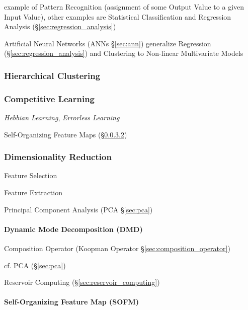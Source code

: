 example of Pattern Recognition (assignment of some Output Value to a given Input
Value), other examples are Statistical Classification and Regression Analysis
(\S\ref{sec:regression_analysis})

Artificial Neural Networks (ANNs \S\ref{sec:ann}) generalize Regression
(\S\ref{sec:regression_analysis}) and Clustering to Non-linear Multivariate
Models



\subsubsection{Hierarchical Clustering}\label{sec:hierarchical_clustering}

\subsubsection{Competitive Learning}\label{sec:competitive_learning}

\emph{Hebbian Learning}, \emph{Errorless Learning}

Self-Organizing Feature Maps (\S\ref{sec:sofm})



\subsubsection{Dimensionality Reduction}\label{sec:dimensionality_reduction}

Feature Selection

Feature Extraction

Principal Component Analysis (PCA \S\ref{sec:pca})



\paragraph{Dynamic Mode Decomposition (DMD)}\label{sec:dmd}\hfill

Composition Operator (Koopman Operator \S\ref{sec:composition_operator})

cf. PCA (\S\ref{sec:pca})

\fist Reservoir Computing (\S\ref{sec:reservoir_computing})



\paragraph{Self-Organizing Feature Map (SOFM)}\label{sec:sofm}\hfill

